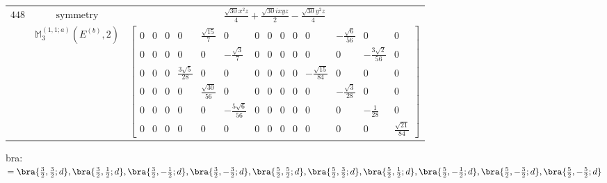 \documentclass[fleqn,8pt,landscape]{jsarticle}
\begin{document}
\begin{longtable}{ccc}
$ 448 $ & $ \text{symmetry} $ & $ \frac{\sqrt{30} x^{2} z}{4} + \frac{\sqrt{30} i x y z}{2} - \frac{\sqrt{30} y^{2} z}{4} $ \\
$  $ & $ \mathbb{M}_{3}^{(1,1;a)}(E^{(b)},2) $ & $ \begin{bmatrix} 0 & 0 & 0 & 0 & \frac{\sqrt{15}}{7} & 0 & 0 & 0 & 0 & 0 & 0 & - \frac{\sqrt{6}}{56} & 0 & 0 \\ 0 & 0 & 0 & 0 & 0 & - \frac{\sqrt{3}}{7} & 0 & 0 & 0 & 0 & 0 & 0 & - \frac{3 \sqrt{2}}{56} & 0 \\ 0 & 0 & 0 & \frac{3 \sqrt{5}}{28} & 0 & 0 & 0 & 0 & 0 & 0 & - \frac{\sqrt{15}}{84} & 0 & 0 & 0 \\ 0 & 0 & 0 & 0 & \frac{\sqrt{30}}{56} & 0 & 0 & 0 & 0 & 0 & 0 & - \frac{\sqrt{3}}{28} & 0 & 0 \\ 0 & 0 & 0 & 0 & 0 & - \frac{5 \sqrt{6}}{56} & 0 & 0 & 0 & 0 & 0 & 0 & - \frac{1}{28} & 0 \\ 0 & 0 & 0 & 0 & 0 & 0 & 0 & 0 & 0 & 0 & 0 & 0 & 0 & \frac{\sqrt{21}}{84} \end{bmatrix} $ \\ \hline
\end{longtable}
bra: $=\bra{\frac{3}{2},\frac{3}{2};d}, \bra{\frac{3}{2},\frac{1}{2};d}, \bra{\frac{3}{2},- \frac{1}{2};d}, \bra{\frac{3}{2},- \frac{3}{2};d}, \bra{\frac{5}{2},\frac{5}{2};d}, \bra{\frac{5}{2},\frac{3}{2};d}, \bra{\frac{5}{2},\frac{1}{2};d}, \bra{\frac{5}{2},- \frac{1}{2};d}, \bra{\frac{5}{2},- \frac{3}{2};d}, \bra{\frac{5}{2},- \frac{5}{2};d}$
\end{document}
